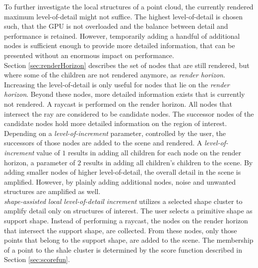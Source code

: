 To further investigate the local structures of a point cloud, the currently rendered maximum level-of-detail might not suffice. The highest level-of-detail is chosen such, that the GPU is not overloaded and the balance between detail and performance is retained. However, temporarily adding a handful of additional nodes is sufficient enough to provide more detailed information, that can be presented without an enormous impact on performance.
\\

Section \ref{sec:renderHorizon} describes the set of nodes that are still rendered, but where some of the children are not rendered anymore, as \textit{render horizon}. 
Increasing the level-of-detail is only useful for nodes that lie on the \textit{render horizon}. Beyond these nodes, more detailed information exists that is currently not rendered. A raycast is performed on the render horizon. All nodes that intersect the ray are considered to be candidate nodes. The successor nodes of the candidate nodes hold more detailed information on the region of interest. Depending on a \textit{level-of-increment} parameter, controlled by the user, the successors of those nodes are added to the scene and rendered. A \textit{level-of-increment} value of $1$ results in adding all children for each node on the render horizon, a parameter of $2$ results in adding all children's children to the scene. 
By adding smaller nodes of higher level-of-detail, the overall detail in the scene is amplified. However, by plainly adding additional nodes, noise and unwanted structures are amplified as well. 
\\

\textit{shape-assisted local level-of-detail increment} utilizes a selected shape cluster to amplify detail only on structures of interest. The user selects a primitive shape as support shape. Instead of performing a raycast, the nodes on the render horizon that intersect the support shape, are collected. From these nodes, only those points that belong to the support shape, are added to the scene. The membership of a point to the shale cluster is determined by the score function described in Section \ref{sec:scorefun}. 

